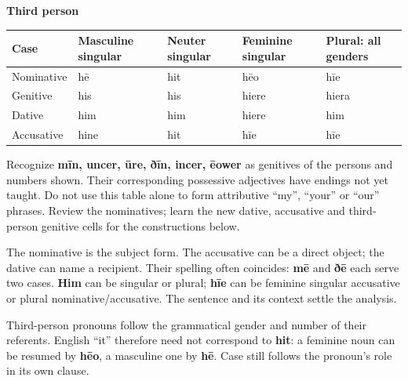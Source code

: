 \par\addvspace{5pt}
\par\addvspace{3pt}
\textbf{Third person}\par\nobreak
\par\begingroup
\fontsize{10.5}{13.2}\selectfont
\setlength{\LTleft}{0pt}\setlength{\LTright}{\fill}
\noindent
\begin{tabular}{@{}>{\raggedright\arraybackslash}p{22.0mm}>{\raggedright\arraybackslash}p{22.688mm}>{\raggedright\arraybackslash}p{22.688mm}>{\raggedright\arraybackslash}p{22.688mm}>{\raggedright\arraybackslash}p{22.688mm}@{}}
\toprule
\textbf{Case} & \textbf{Masculine singular} & \textbf{Neuter singular} & \textbf{Feminine singular} & \textbf{Plural: all genders} \\
\midrule
Nominative & hē & hit & hēo & hīe \\
Genitive & his & his & hiere & hiera \\
Dative & him & him & hiere & him \\
Accusative & hine & hit & hīe & hīe \\
\bottomrule
\end{tabular}
\par\endgroup
Recognize \textbf{mīn, uncer, ūre, ðīn, incer, ēower} as genitives of the persons and numbers shown. Their corresponding possessive adjectives have endings not yet taught. Do not use this table alone to form attributive “my”, “your” or “our” phrases. Review the nominatives; learn the new dative, accusative and third-person genitive cells for the constructions below.

The nominative is the subject form. The accusative can be a direct object; the dative can name a recipient. Their spelling often coincides: \textbf{mē} and \textbf{ðē} each serve two cases. \textbf{Him} can be singular or plural; \textbf{hīe} can be feminine singular accusative or plural nominative/\allowbreak{}accusative. The sentence and its context settle the analysis.

Third-person pronouns follow the grammatical gender and number of their referents. English “it” therefore need not correspond to \textbf{hit}: a feminine noun can be resumed by \textbf{hēo}, a masculine one by \textbf{hē}. Case still follows the pronoun’s role in its own clause.

